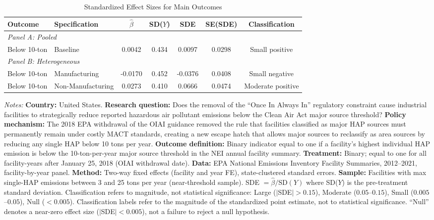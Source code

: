 \begin{table}[H]
\centering
\caption{Standardized Effect Sizes for Main Outcomes}
\label{tab:sde}
\begin{threeparttable}
\small
\begin{adjustbox}{max width=\textwidth}
\begin{tabular}{llccccc}
\toprule
Outcome & Specification & $\hat{\beta}$ & SD($Y$) & SDE & SE(SDE) & Classification \\
\midrule
\multicolumn{7}{l}{\textit{Panel A: Pooled}} \\
Below 10-ton & Baseline & 0.0042 & 0.434 & 0.0097 & 0.0298 & Small positive \\
\midrule
\multicolumn{7}{l}{\textit{Panel B: Heterogeneous}} \\
Below 10-ton & Manufacturing & -0.0170 & 0.452 & -0.0376 & 0.0408 & Small negative \\
Below 10-ton & Non-Manufacturing & 0.0273 & 0.410 & 0.0666 & 0.0474 & Moderate positive \\
\bottomrule
\end{tabular}
\end{adjustbox}
\begin{tablenotes}[flushleft]
\small
\item \textit{Notes:} \textbf{Country:} United States. \textbf{Research question:} Does the removal of the ``Once In Always In'' regulatory constraint cause industrial facilities to strategically reduce reported hazardous air pollutant emissions below the Clean Air Act major source threshold? \textbf{Policy mechanism:} The 2018 EPA withdrawal of the OIAI guidance removed the rule that facilities classified as major HAP sources must permanently remain under costly MACT standards, creating a new escape hatch that allows major sources to reclassify as area sources by reducing any single HAP below 10 tons per year. \textbf{Outcome definition:} Binary indicator equal to one if a facility's highest individual HAP emission is below the 10-ton-per-year major source threshold in the NEI annual facility summary. \textbf{Treatment:} Binary; equal to one for all facility-years after January 25, 2018 (OIAI withdrawal date). \textbf{Data:} EPA National Emissions Inventory Facility Summaries, 2012--2021, facility-by-year panel. \textbf{Method:} Two-way fixed effects (facility and year FE), state-clustered standard errors. \textbf{Sample:} Facilities with max single-HAP emissions between 3 and 25 tons per year (near-threshold sample). SDE $= \hat{\beta} / \text{SD}(Y)$ where SD($Y$) is the pre-treatment standard deviation. Classification refers to magnitude, not statistical significance: Large ($|$SDE$| > 0.15$), Moderate ($0.05$--$0.15$), Small ($0.005$--$0.05$), Null ($< 0.005$). Classification labels refer to the magnitude of the standardized point estimate, not to statistical significance. ``Null'' denotes a near-zero effect size ($|$SDE$| < 0.005$), not a failure to reject a null hypothesis.
\end{tablenotes}
\end{threeparttable}
\end{table}


